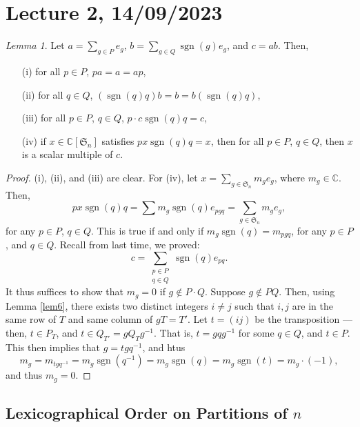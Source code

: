\documentclass[a4paper]{report}
\theoremstyle{definition}
\theoremstyle{remark}
\theoremstyle{proposition}
\theoremstyle{conjecture}
\theoremstyle{lemma}
\newtheorem{lemma}{Lemma}
\theoremstyle{corollary}
\theoremstyle{exercise}
\theoremstyle{example}
\newcommand{\C}{\mathbb{C}}
\newcommand{\on}{\operatorname}
\begin{document}
\section{Lecture 2, 14/09/2023}

\begin{lemma}\label{lem7}
    Let $a = \sum_{g \in P} e_g$, $b = \sum_{g \in Q}\on{sgn}(g)e_g$, and 
    $c=ab$.
    Then,
    \begin{itemize}
        \item[(i)] for all $p\in P$, $pa = a = ap$,
        \item[(ii)] for all $q\in Q$, $(\on{sgn}(q)q)b = b = b (\on{sgn}(q)q)$,
        \item[(iii)] for all $p\in P$, $q\in Q$, $p \cdot c \on{sgn}(q)q=c$,
        \item[(iv)] if $x\in\C[\mathfrak{S}_n]$ satisfies $px\on{sgn}(q)q=x$,
            then for all $p\in P$, $q\in Q$, then $x$ is a scalar multiple
            of $c$.
    \end{itemize}
\end{lemma}

\begin{proof}
    (i), (ii), and (iii) are clear. For (iv), let 
    $x = \sum_{g\in\mathfrak{S}_n}m_ge_g$, where $m_g \in \C$.
    Then,
    $$px\on{sgn}(q)q = \sum m_g \on{sgn}(q)e_{pgq} = \sum_{g\in\mathfrak{S}_n} m_ge_g,$$
    for any $p\in P$, $q\in Q$.
    This is true if and only if $m_g\on{sgn}(q) = m_{pgq}$, for any $p\in P$, 
    and $q\in Q$.
    Recall from last time, we proved:
    $$c = \sum_{\substack{p\in P\\q\in Q}}\on{sgn}(q)e_{pq}.$$
    It thus suffices to show that $m_g = 0$ if $g \not\in P \cdot Q$.
    Suppose $g\not\in PQ$. 
    Then, using Lemma \ref{lem6}, there exists two distinct integers
    $i\neq j$ such that $i,j$ are in the same row of $T$ and 
    same column of $gT = T'$. Let $t = (ij)$ be the transposition --- then,
    $t \in P_T$, and $t \in Q_{T'} = gQ_Tg^{-1}$. That is, 
    $t = gqg^{-1}$ for some $q\in Q$, and $t \in P$.
    This then implies that $g = tgq^{-1}$, and htus 
    $$m_g = m_{tgq^{-1}} = m_g\on{sgn}(q^{-1}) = m_g\on{sgn}(q) = m_g\on{sgn}(t) = m_g\cdot (-1),$$
    and thus $m_g = 0$.

\end{proof}

\subsection{Lexicographical Order on Partitions of $n$}
\end{document}
